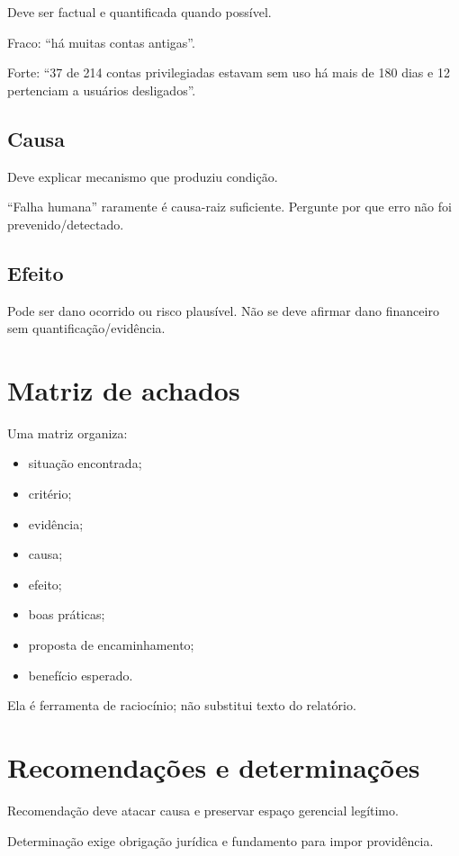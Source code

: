 Deve ser factual e quantificada quando possível.

Fraco: ``há muitas contas antigas''.

Forte: ``37 de 214 contas privilegiadas estavam sem uso há mais de 180 dias e 12 pertenciam a usuários desligados''.

\subsection{Causa}

Deve explicar mecanismo que produziu condição.

``Falha humana'' raramente é causa-raiz suficiente. Pergunte por que erro não foi prevenido/detectado.

\subsection{Efeito}

Pode ser dano ocorrido ou risco plausível. Não se deve afirmar dano financeiro sem quantificação/evidência.

\section{Matriz de achados}

Uma matriz organiza:
\begin{itemize}
\item situação encontrada;
\item critério;
\item evidência;
\item causa;
\item efeito;
\item boas práticas;
\item proposta de encaminhamento;
\item benefício esperado.
\end{itemize}

Ela é ferramenta de raciocínio; não substitui texto do relatório.

\section{Recomendações e determinações}

Recomendação deve atacar causa e preservar espaço gerencial legítimo.

Determinação exige obrigação jurídica e fundamento para impor providência.

